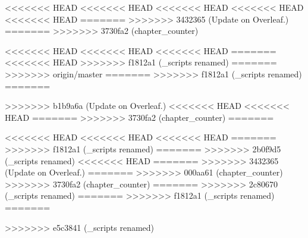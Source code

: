 

% 
% 
\setcounter{chapter}{1}
<<<<<<< HEAD
<<<<<<< HEAD
<<<<<<< HEAD
<<<<<<< HEAD
<<<<<<< HEAD
=======
>>>>>>> 3432365 (Update on Overleaf.)
=======
>>>>>>> 3730fa2 (chapter_counter)

<<<<<<< HEAD
<<<<<<< HEAD
<<<<<<< HEAD
% 
% 
=======
<<<<<<< HEAD
>>>>>>> f1812a1 (_scripts renamed)
=======
>>>>>>> origin/master
=======
>>>>>>> f1812a1 (_scripts renamed)
% 
% 
=======


>>>>>>> b1b9a6a (Update on Overleaf.)
<<<<<<< HEAD
<<<<<<< HEAD
=======
>>>>>>> 3730fa2 (chapter_counter)
=======

% 
% 
<<<<<<< HEAD
<<<<<<< HEAD
<<<<<<< HEAD
=======
>>>>>>> f1812a1 (_scripts renamed)
=======
% 
% 
% 
>>>>>>> 2b0f9d5 (_scripts renamed)
<<<<<<< HEAD
=======
>>>>>>> 3432365 (Update on Overleaf.)
=======
>>>>>>> 000aa61 (chapter_counter)
>>>>>>> 3730fa2 (chapter_counter)
=======
>>>>>>> 2c80670 (_scripts renamed)
=======
>>>>>>> f1812a1 (_scripts renamed)
=======

% 
% 
>>>>>>> e5c3841 (_scripts renamed)
% 
% 

